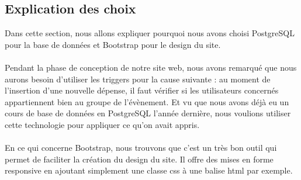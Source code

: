 \documentclass[a4paper, 11pt]{article}
\begin{document}
\subsection{Explication des choix}
Dans cette section, nous allons expliquer pourquoi nous avons choisi PostgreSQL pour la base de données et Bootstrap pour le design du site.
\paragraph{} Pendant la phase de conception de notre site web, nous avons remarqué que nous aurons besoin d'utiliser les triggers pour la cause suivante : au moment de l'insertion d'une nouvelle dépense, il faut vérifier si les utilisateurs concernés appartiennent bien au groupe de l'évènement. Et vu que nous avons déjà eu un cours de base de données en PostgreSQL l'année dernière, nous voulions utiliser cette technologie pour appliquer ce qu'on avait appris.
\paragraph{} En ce qui concerne Bootstrap, nous trouvons que c'est un très bon outil qui permet de faciliter la création du design du site. Il offre des mises en forme responsive en ajoutant simplement une classe css à une balise html par exemple.
\end{document}
